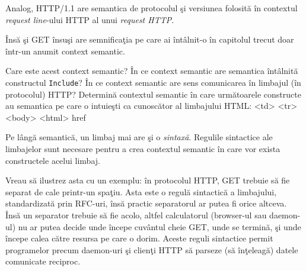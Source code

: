 Analog, {\glqq}HTTP/1.1{\grqq} are semantica de {\glqq}protocolul şi versiunea folosită{\grqq}
în contextul \textit{request line}-ului HTTP al unui \textit{request HTTP}.

\begin{Exercise}[title={Întrebări de sinteză},difficulty=2]
Însă şi GET însuşi are semnificaţia pe care ai întâlnit-o în capitolul
trecut doar într-un anumit context semantic.

\Question Care este acest context semantic?
\Question În ce context semantic are semantica întâlnită constructul \texttt{Include}?
\Question În ce context semantic are sens comunicarea în limbajul (în protocolul) HTTP?
\ExeText Determină contextul semantic în care următoarele constructe au semantica pe
care o intuieşti ca cunoscător al limbajului HTML:
\Question <td>
\Question <tr>
\Question <body>
\Question <html>
\Question href
\end{Exercise}



Pe lângă semantică, un limbaj mai are şi o \textsl{sintaxă}. Regulile sintactice
ale limbajelor sunt necesare pentru a crea contextul semantic în
care vor exista constructele acelui limbaj.

Vreau să ilustrez asta cu un exemplu: în protocolul HTTP, GET trebuie
să fie separat de cale printr-un spaţiu. Asta este o regulă sintactică
a limbajului, standardizată prin
RFC-uri,
însă practic separatorul ar putea fi orice altceva.
Însă un separator trebuie să fie acolo, altfel calculatorul (browser-ul
sau daemon-ul) nu ar putea decide unde începe cuvântul cheie {\glqq}GET{\grqq}, unde
se termină, şi unde începe calea către resursa pe care o dorim.
Aceste reguli sintactice
permit programelor precum daemon-uri şi clienţi HTTP
să parseze (să {\glqq}înţeleagă{\grqq}) datele comunicate reciproc.

